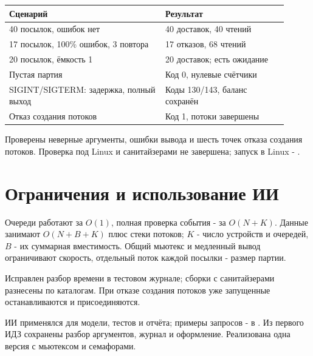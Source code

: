 \begin{center}
\begin{tabular}{p{0.51\linewidth}p{0.40\linewidth}}
\toprule
Сценарий & Результат \\
\midrule
40 посылок, ошибок нет & 40 доставок, 40 чтений \\
17 посылок, 100\% ошибок, 3 повтора & 17 отказов, 68 чтений \\
20 посылок, ёмкость 1 & 20 доставок; есть ожидание \\
Пустая партия & Код 0, нулевые счётчики \\
SIGINT/SIGTERM: задержка, полный выход & Коды 130/143, баланс сохранён \\
Отказ создания потоков & Код 1, потоки завершены \\
\bottomrule
\end{tabular}
\end{center}
Проверены неверные аргументы, ошибки вывода и шесть точек отказа создания потоков. Проверка под Linux и санитайзерами не завершена; запуск в Linux - .

\section{Ограничения и использование ИИ}
\begin{exercise}
Очереди работают за $O(1)$, полная проверка события - за $O(N+K)$. Данные занимают $O(N+B+K)$ плюс стеки потоков; $K$ - число устройств и очередей, $B$ - их суммарная вместимость. Общий мьютекс и медленный вывод ограничивают скорость, отдельный поток каждой посылки - размер партии.

Исправлен разбор времени в тестовом журнале; сборки с санитайзерами разнесены по каталогам. При отказе создания потоков уже запущенные останавливаются и присоединяются.
\end{exercise}

ИИ применялся для модели, тестов и отчёта; примеры запросов - в . Из первого ИДЗ сохранены разбор аргументов, журнал и оформление. Реализована одна версия с мьютексом и семафорами.
